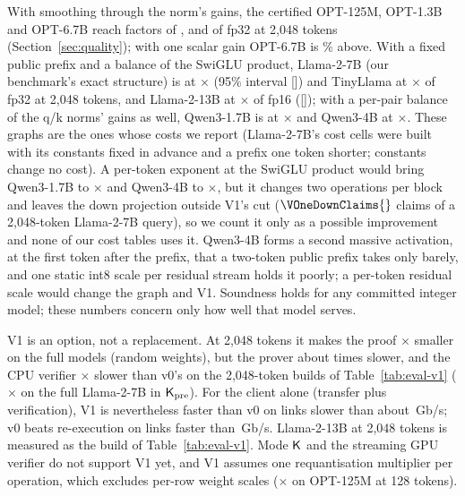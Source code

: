  With smoothing through the norm's gains, the certified OPT-125M,
OPT-1.3B and OPT-6.7B reach factors of \QualityRatioOptS{}, \QualityRatioOptM{} and \QualityRatioOptL{} of fp32 at 2{,}048 tokens
(Section~\ref{sec:quality}); with one scalar gain OPT-6.7B is \QualityScalarExcessOptL{}\% above. With a fixed public prefix and a balance of
the SwiGLU product, Llama-2-7B (our benchmark's exact structure) is at $\times$\LlamaSevenRatio{} (95\% interval
[\LlamaSevenCI{}]) and TinyLlama at
$\times$\TinyLlamaRatio{} of fp32 at 2{,}048 tokens, and Llama-2-13B at $\times$\LlamaThirteenRatio{} of fp16
([\LlamaThirteenCI{}]); with a per-pair balance of the q/k norms' gains as
well, Qwen3-1.7B is at $\times$\QwenMRatio{} and Qwen3-4B at $\times$\QwenLRatio{}. These graphs are the ones whose
costs we report (Llama-2-7B's cost cells were built with its constants fixed in advance and a prefix one token
shorter; constants change no cost). A per-token exponent at the SwiGLU product would bring Qwen3-1.7B to $\times$\QwenMExpRatio{}
and Qwen3-4B to $\times$\QwenLExpRatio{}, but it changes two operations per block and leaves the down projection
outside V1's cut ($\VOneDownClaims{}$ claims of a 2{,}048-token Llama-2-7B query), so we count it only as a possible
improvement and none of our cost tables uses it. Qwen3-4B forms a second massive activation, at the
first token after the prefix, that a two-token public prefix takes only barely, and one static int8 scale per
residual stream holds it poorly; a per-token residual scale would change the graph and V1. Soundness holds for any committed integer model; these
numbers concern only how well that model serves.

 V1 is an option, not a replacement. At 2{,}048 tokens it makes the proof
\VOneRatioRandom{}$\times$ smaller on the full models (random weights), but the prover about
\VOneProverRatioAbout{} times slower, and the CPU verifier \VOneVerifyRatioLong{}$\times$ slower than
v0's on the 2{,}048-token builds of Table~\ref{tab:eval-v1} (\VOneVerifyRatioLlama{}$\times$ on the full
Llama-2-7B in $\mathsf{K}_{\mathrm{pre}}$). For the client alone (transfer plus
verification), V1 is nevertheless faster than v0 on links slower than about \BreakevenVOneFaster{}\,Gb/s; v0 beats
re-execution on links faster than \BreakevenLinkLong{}\,Gb/s\BreakevenVOneClause{}. Llama-2-13B at 2{,}048 tokens is
measured as the build of Table~\ref{tab:eval-v1}. Mode $\mathsf{K}$ and the streaming GPU verifier do not
support V1 yet, and V1 assumes one requantisation multiplier per operation, which excludes
per-row weight scales ($\times$\pviLoHi{\RowScalesLo}{\RowScalesHi}{--} on OPT-125M at 128 tokens).

